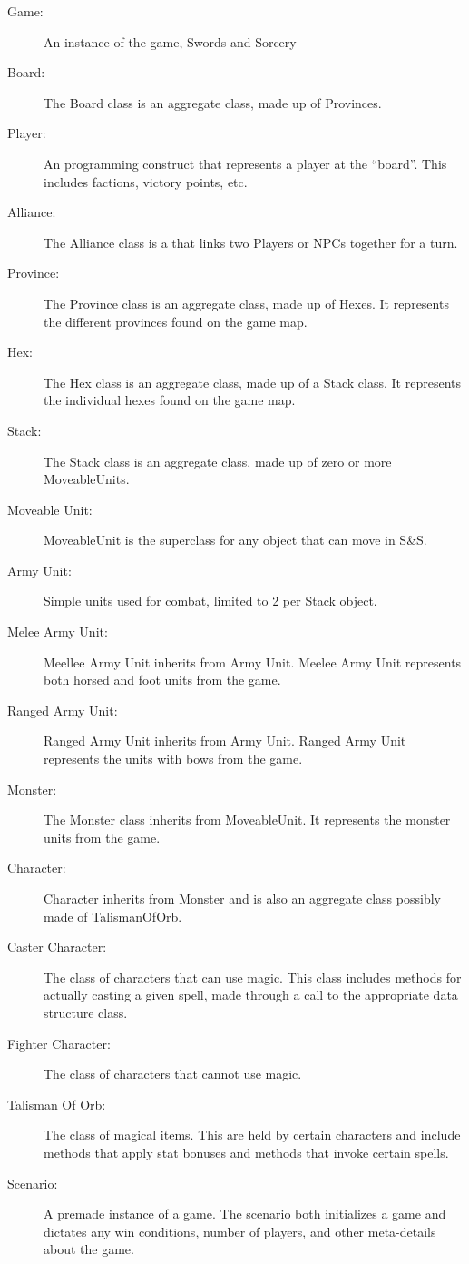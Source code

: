 \documentclass[11pt]{article}
\begin{document}
\begin{description}
\item[Game:] An instance of the game, Swords and Sorcery
\item[Board:] The Board class is an aggregate class, made up of Provinces.
\item[Player:] An programming construct that represents a player at the ``board''. This includes factions, victory points, etc.
\item[Alliance:] The Alliance class is a that links two Players or NPCs together for a turn.
\item[Province:] The Province class is an aggregate class, made up of Hexes. It represents the different provinces found on the game map.
\item[Hex:] The Hex class is an aggregate class, made up of a Stack class. It represents the individual hexes found on the game map.
\item[Stack:] The Stack class is an aggregate class, made up of zero or more MoveableUnits.
\item[Moveable Unit:] MoveableUnit is the superclass for any object that can move in S\&S.
\item[Army Unit:] Simple units used for combat, limited to 2 per Stack object.
\item[Melee Army Unit:] Meellee Army Unit inherits from Army Unit. Meelee Army Unit represents both horsed and foot units from the game.
\item[Ranged Army Unit:] Ranged Army Unit inherits from Army Unit. Ranged Army Unit represents the units with bows from the game.
\item[Monster:] The Monster class inherits from MoveableUnit. It represents the monster units from the game.
\item[Character:] Character inherits from Monster and is also an aggregate class possibly made of TalismanOfOrb.
\item[Caster Character:] The class of characters that can use magic. This class includes methods for actually casting a given spell, made through a call to the appropriate data structure class.
\item[Fighter Character:] The class of characters that cannot use magic.
\item[Talisman Of Orb:] The class of magical items. This are held by certain characters and include methods that apply stat bonuses and methods that invoke certain spells.
\item[Scenario:] A premade instance of a game. The scenario both initializes a game and dictates any win conditions, number of players, and other meta-details about the game.

\end{description}
\end{document}
